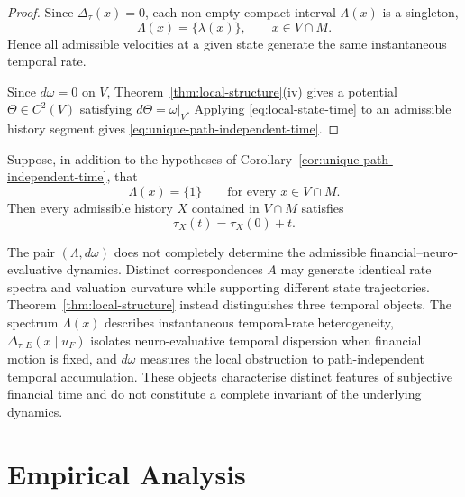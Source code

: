 \documentclass[graybox,natbib]{SNmult}
\providecommand{\1}{}
\renewcommand{\1}{\mathbbm 1}
\begin{document}
\begin{proof}

Since \(\Delta_\tau(x)=0\), each non-empty compact interval
\(\Lambda(x)\) is a singleton,
\[
\Lambda(x)=\{\lambda(x)\},
\qquad x\in V\cap M.
\]
Hence all admissible velocities at a given state generate the same
instantaneous temporal rate.

Since \(d\omega=0\) on \(V\),
Theorem~\ref{thm:local-structure}(iv) gives a potential
\(\Theta\in C^2(V)\) satisfying \(d\Theta=\omega|_V\). Applying
\eqref{eq:local-state-time} to an admissible history segment gives
\eqref{eq:unique-path-independent-time}.
\end{proof}


\begin{corollary}
\label{cor:calendar-time}

Suppose, in addition to the hypotheses of
Corollary~\ref{cor:unique-path-independent-time}, that
\[
\Lambda(x)=\{1\}
\qquad
\text{for every }x\in V\cap M.
\]
Then every admissible history \(X\) contained in \(V\cap M\) satisfies
\begin{equation}
\tau_X(t)
=
\tau_X(0)+t.
\label{eq:calendar-recovery}
\end{equation}
\end{corollary}


\begin{remark}
The pair \((\Lambda,d\omega)\) does not completely determine the admissible
financial--neuro-evaluative dynamics. Distinct correspondences \(A\) may
generate identical rate spectra and valuation curvature while supporting
different state trajectories. Theorem~\ref{thm:local-structure} instead
distinguishes three temporal objects. The spectrum \(\Lambda(x)\) describes
instantaneous temporal-rate heterogeneity,
\(\Delta_{\tau,E}(x\mid u_F)\) isolates neuro-evaluative temporal dispersion
when financial motion is fixed, and \(d\omega\) measures the local obstruction
to path-independent temporal accumulation. These objects characterise distinct
features of subjective financial time and do not constitute a complete
invariant of the underlying dynamics.
\end{remark}



\section{Empirical Analysis}
\label{sec:empirical}
\end{document}
